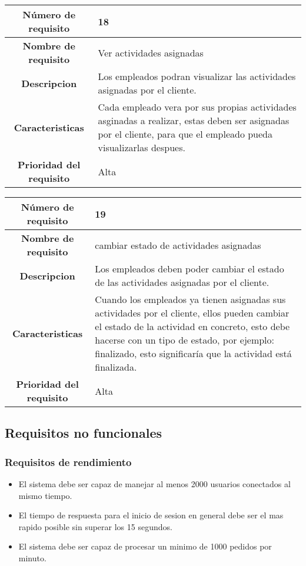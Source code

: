 \documentclass[12pt,a4paper, twosite]{article}
\begin{document}
\begin{center}
    \begin{tabular}{|c|p{6cm}|}
        \hline
        \textbf{Número de requisito} & 18\\ 
        \hline
        \textbf{Nombre de requisito} &  Ver actividades asignadas \\
        \hline
        \textbf{Descripcion} & Los empleados podran visualizar las actividades asignadas por el cliente.  \\
        \hline
        \textbf{Caracteristicas} & Cada empleado vera por sus propias actividades asginadas a realizar, estas deben ser asignadas por el cliente, para que el empleado pueda visualizarlas despues.   \\
        \hline
        \textbf{Prioridad del requisito} & Alta \\
        \hline
     \end{tabular}
\end{center}

\begin{center}
    \begin{tabular}{|c|p{6cm}|}
        \hline
        \textbf{Número de requisito} & 19\\ 
        \hline
        \textbf{Nombre de requisito} &  cambiar estado de actividades asignadas \\
        \hline
        \textbf{Descripcion} & Los empleados deben poder cambiar el estado de las actividades asignadas por el cliente. \\
        \hline
        \textbf{Caracteristicas} & Cuando los empleados ya tienen asignadas sus actividades por el cliente, ellos pueden cambiar el estado de la actividad en concreto, esto debe hacerse con un tipo de estado, por ejemplo: finalizado, esto significaría que la actividad está finalizada.   \\
        \hline
        \textbf{Prioridad del requisito} & Alta \\
        \hline
     \end{tabular}
\end{center}


\subsection{Requisitos no funcionales}

\subsubsection{Requisitos de rendimiento}
\begin{itemize}
\item El sistema debe ser capaz de manejar al menos 2000 usuarios conectados al mismo tiempo. 
\item El tiempo de respuesta  para el inicio de sesion en general debe ser el mas rapido posible sin superar los 15 segundos.
\item  El sistema debe ser capaz de procesar un minimo de 1000 pedidos por minuto.  
\end{itemize}
\end{document}
